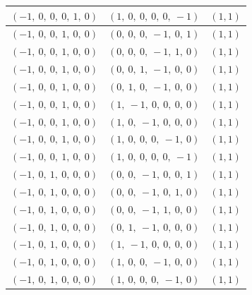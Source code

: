 \documentclass[11pt]{article}
\theoremstyle{definition}
\begin{document}
\begin{longtable}{|l|l|c|}
    \hline
    $\left( -1, \  0, \  0, \  0, \  1, \  0\right)$ & $\left( 1, \  0, \  0, \  0, \  0, \  -1\right)$ & $(1,1)$ \\
    \hline
    $\left( -1, \  0, \  0, \  1, \  0, \  0\right)$ & $\left( 0, \  0, \  0, \  -1, \  0, \  1\right)$ & $(1,1)$ \\
    \hline
    $\left( -1, \  0, \  0, \  1, \  0, \  0\right)$ & $\left( 0, \  0, \  0, \  -1, \  1, \  0\right)$ & $(1,1)$ \\
    \hline
    $\left( -1, \  0, \  0, \  1, \  0, \  0\right)$ & $\left( 0, \  0, \  1, \  -1, \  0, \  0\right)$ & $(1,1)$ \\
    \hline
    $\left( -1, \  0, \  0, \  1, \  0, \  0\right)$ & $\left( 0, \  1, \  0, \  -1, \  0, \  0\right)$ & $(1,1)$ \\
    \hline
    $\left( -1, \  0, \  0, \  1, \  0, \  0\right)$ & $\left( 1, \  -1, \  0, \  0, \  0, \  0\right)$ & $(1,1)$ \\
    \hline
    $\left( -1, \  0, \  0, \  1, \  0, \  0\right)$ & $\left( 1, \  0, \  -1, \  0, \  0, \  0\right)$ & $(1,1)$ \\
    \hline
    $\left( -1, \  0, \  0, \  1, \  0, \  0\right)$ & $\left( 1, \  0, \  0, \  0, \  -1, \  0\right)$ & $(1,1)$ \\
    \hline
    $\left( -1, \  0, \  0, \  1, \  0, \  0\right)$ & $\left( 1, \  0, \  0, \  0, \  0, \  -1\right)$ & $(1,1)$ \\
    \hline
    $\left( -1, \  0, \  1, \  0, \  0, \  0\right)$ & $\left( 0, \  0, \  -1, \  0, \  0, \  1\right)$ & $(1,1)$ \\
    \hline
    $\left( -1, \  0, \  1, \  0, \  0, \  0\right)$ & $\left( 0, \  0, \  -1, \  0, \  1, \  0\right)$ & $(1,1)$ \\
    \hline
    $\left( -1, \  0, \  1, \  0, \  0, \  0\right)$ & $\left( 0, \  0, \  -1, \  1, \  0, \  0\right)$ & $(1,1)$ \\
    \hline
    $\left( -1, \  0, \  1, \  0, \  0, \  0\right)$ & $\left( 0, \  1, \  -1, \  0, \  0, \  0\right)$ & $(1,1)$ \\
    \hline
    $\left( -1, \  0, \  1, \  0, \  0, \  0\right)$ & $\left( 1, \  -1, \  0, \  0, \  0, \  0\right)$ & $(1,1)$ \\
    \hline
    $\left( -1, \  0, \  1, \  0, \  0, \  0\right)$ & $\left( 1, \  0, \  0, \  -1, \  0, \  0\right)$ & $(1,1)$ \\
    \hline
    $\left( -1, \  0, \  1, \  0, \  0, \  0\right)$ & $\left( 1, \  0, \  0, \  0, \  -1, \  0\right)$ & $(1,1)$ \\

\end{longtable}
\end{document}
